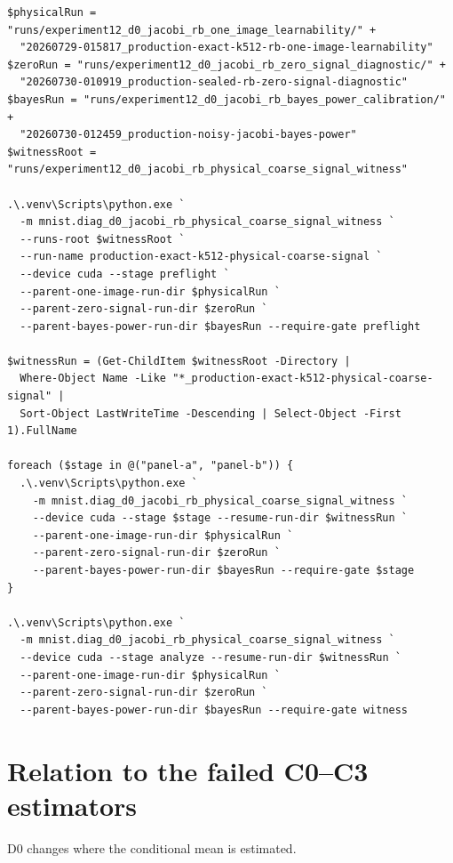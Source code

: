 \documentclass[11pt]{article}
\numberwithin{equation}{section}
\newcommand{\1}{\mathbf 1}
\begin{document}
\begin{Verbatim}[fontsize=\scriptsize,breaklines=true,breakanywhere=true]
$physicalRun = "runs/experiment12_d0_jacobi_rb_one_image_learnability/" +
  "20260729-015817_production-exact-k512-rb-one-image-learnability"
$zeroRun = "runs/experiment12_d0_jacobi_rb_zero_signal_diagnostic/" +
  "20260730-010919_production-sealed-rb-zero-signal-diagnostic"
$bayesRun = "runs/experiment12_d0_jacobi_rb_bayes_power_calibration/" +
  "20260730-012459_production-noisy-jacobi-bayes-power"
$witnessRoot = "runs/experiment12_d0_jacobi_rb_physical_coarse_signal_witness"

.\.venv\Scripts\python.exe `
  -m mnist.diag_d0_jacobi_rb_physical_coarse_signal_witness `
  --runs-root $witnessRoot `
  --run-name production-exact-k512-physical-coarse-signal `
  --device cuda --stage preflight `
  --parent-one-image-run-dir $physicalRun `
  --parent-zero-signal-run-dir $zeroRun `
  --parent-bayes-power-run-dir $bayesRun --require-gate preflight

$witnessRun = (Get-ChildItem $witnessRoot -Directory |
  Where-Object Name -Like "*_production-exact-k512-physical-coarse-signal" |
  Sort-Object LastWriteTime -Descending | Select-Object -First 1).FullName

foreach ($stage in @("panel-a", "panel-b")) {
  .\.venv\Scripts\python.exe `
    -m mnist.diag_d0_jacobi_rb_physical_coarse_signal_witness `
    --device cuda --stage $stage --resume-run-dir $witnessRun `
    --parent-one-image-run-dir $physicalRun `
    --parent-zero-signal-run-dir $zeroRun `
    --parent-bayes-power-run-dir $bayesRun --require-gate $stage
}

.\.venv\Scripts\python.exe `
  -m mnist.diag_d0_jacobi_rb_physical_coarse_signal_witness `
  --device cuda --stage analyze --resume-run-dir $witnessRun `
  --parent-one-image-run-dir $physicalRun `
  --parent-zero-signal-run-dir $zeroRun `
  --parent-bayes-power-run-dir $bayesRun --require-gate witness
\end{Verbatim}

\section{Relation to the failed C0--C3 estimators}

D0 changes where the conditional mean is estimated.
\end{document}
